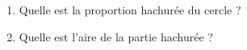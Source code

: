 
\begin{exercice}\label{exo2smath-0267}
 
    \begin{enumerate}
        \item
    Quelle est la proportion hachurée du cercle ?
\item
    Quelle est l'aire de la partie hachurée ?
    \end{enumerate}
\end{exercice}

